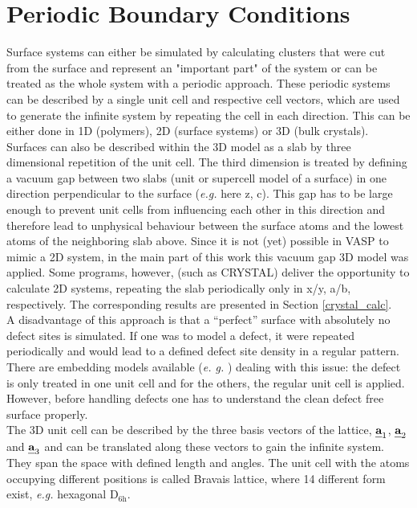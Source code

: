 \documentclass[11pt,DIV=13,BCOR=5mm,a4paper,headinclude]{scrbook}
\def\mathbi#1{\textbf{\em #1}}
\renewcommand{\vec}[1]{\mathbi{#1}}
\begin{document}
\section{Periodic Boundary Conditions}
Surface systems can either be simulated by calculating clusters that were cut from the surface and represent an "important part" of the system or can be treated as the whole system with a periodic approach.
These periodic systems can be described by a single unit cell and respective cell vectors, which are used to generate the infinite system by repeating the cell in each direction.
This can be either done in 1D (polymers), 2D (surface systems) or 3D (bulk crystals).
Surfaces can also be described within the 3D model as a slab by three dimensional repetition of the unit cell.
The third dimension is treated by defining a vacuum gap between two slabs (unit or supercell model of a surface) in one direction perpendicular to the surface (\textit{e.g.} here z, c).
This gap has to be large enough to prevent unit cells from influencing each other in this direction and therefore lead to unphysical behaviour between the surface atoms and the lowest atoms of the neighboring slab above.
Since it is not (yet) possible in VASP to mimic a 2D system, in the main part of this work this vacuum gap 3D model was applied.
Some programs, however, (such as CRYSTAL) %
deliver the opportunity to calculate 2D systems, repeating the slab periodically only in x/y, a/b, respectively.
The corresponding results are presented in Section \ref{crystal_calc}.
\\
A disadvantage of this approach is that a ``perfect'' surface with absolutely no defect sites is simulated.
If one was to model a defect, it were repeated periodically and would lead to a defined defect site density in a regular pattern.
There are embedding models available (\textit{e.
g.} \cite{Sauer2004}) dealing with this issue: the defect is only treated in one unit cell and for the others, the regular unit cell is applied.
However, before handling defects one has to understand the clean defect free surface properly.
\\
The 3D unit cell can be described by the three basis vectors of the lattice, $\vec{a}_1$, $\vec{a}_2$ and $\vec{a}_3$ and can be translated along these vectors to gain the infinite system.
They span the space with defined length and angles.
The unit cell with the atoms occupying different positions is called Bravais lattice, where 14 different form exist, \textit{e.g.} hexagonal D$_\textrm{6h}$.
\end{document}
